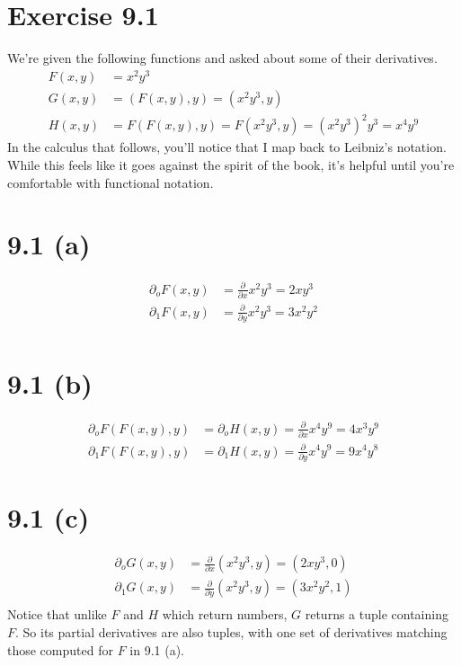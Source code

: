 \documentclass{article}
\begin{document}
\section*{Exercise 9.1}

We're given the following functions and asked about some of their
derivatives.
\begin{align*}
  F(x, y) &= x^2 y^3 \\
  G(x, y) &= (F(x, y), y) = (x^2 y^3, y) \\
  H(x, y) &= F(F(x, y), y) = F(x^2 y^3, y) = (x^2 y^3)^2 y^3 = x^4 y^9
\end{align*}
In the calculus that follows, you'll notice that I map back to
Leibniz's notation. While this feels like it goes against the spirit
of the book, it's helpful until you're comfortable with functional
notation.

\section*{9.1 (a)}

\begin{align*}
  \partial_o F(x, y) &= \frac{\partial}{\partial x} x^2 y^3  = 2 x y^3 \\
  \partial_1 F(x, y) &= \frac{\partial}{\partial y} x^2 y^3  = 3 x^2 y^2 \\
\end{align*}

\section*{9.1 (b)}

\begin{align*}
  \partial_o F(F(x, y), y) &= \partial_o H(x, y) = \frac{\partial}{\partial x} x^4 y^9 = 4 x^3 y^9 \\
  \partial_1 F(F(x, y), y) &= \partial_1 H(x, y) = \frac{\partial}{\partial y} x^4 y^9 = 9 x^4 y^8
\end{align*}

\section*{9.1 (c)}

\begin{align*}
  \partial_o G(x, y) &= \frac{\partial}{\partial x} (x^2 y^3, y)  = (2 x y^3, 0) \\
  \partial_1 G(x, y) &= \frac{\partial}{\partial y} (x^2 y^3, y)  = (3 x^2 y^2, 1) \\
\end{align*}
Notice that unlike $F$ and $H$ which return numbers, $G$ returns a
tuple containing $F$. So its partial derivatives are also tuples, with
one set of derivatives matching those computed for $F$ in 9.1 (a).
\end{document}
